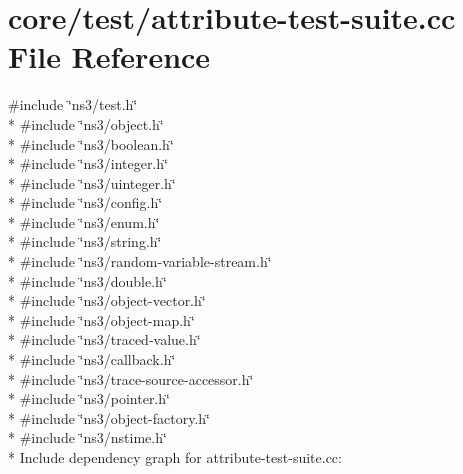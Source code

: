 \hypertarget{attribute-test-suite_8cc}{}\section{core/test/attribute-\/test-\/suite.cc File Reference}
\label{attribute-test-suite_8cc}
{\ttfamily \#include \char`\"{}ns3/test.\+h\char`\"{}}\\*
{\ttfamily \#include \char`\"{}ns3/object.\+h\char`\"{}}\\*
{\ttfamily \#include \char`\"{}ns3/boolean.\+h\char`\"{}}\\*
{\ttfamily \#include \char`\"{}ns3/integer.\+h\char`\"{}}\\*
{\ttfamily \#include \char`\"{}ns3/uinteger.\+h\char`\"{}}\\*
{\ttfamily \#include \char`\"{}ns3/config.\+h\char`\"{}}\\*
{\ttfamily \#include \char`\"{}ns3/enum.\+h\char`\"{}}\\*
{\ttfamily \#include \char`\"{}ns3/string.\+h\char`\"{}}\\*
{\ttfamily \#include \char`\"{}ns3/random-\/variable-\/stream.\+h\char`\"{}}\\*
{\ttfamily \#include \char`\"{}ns3/double.\+h\char`\"{}}\\*
{\ttfamily \#include \char`\"{}ns3/object-\/vector.\+h\char`\"{}}\\*
{\ttfamily \#include \char`\"{}ns3/object-\/map.\+h\char`\"{}}\\*
{\ttfamily \#include \char`\"{}ns3/traced-\/value.\+h\char`\"{}}\\*
{\ttfamily \#include \char`\"{}ns3/callback.\+h\char`\"{}}\\*
{\ttfamily \#include \char`\"{}ns3/trace-\/source-\/accessor.\+h\char`\"{}}\\*
{\ttfamily \#include \char`\"{}ns3/pointer.\+h\char`\"{}}\\*
{\ttfamily \#include \char`\"{}ns3/object-\/factory.\+h\char`\"{}}\\*
{\ttfamily \#include \char`\"{}ns3/nstime.\+h\char`\"{}}\\*
Include dependency graph for attribute-\/test-\/suite.cc\+:
